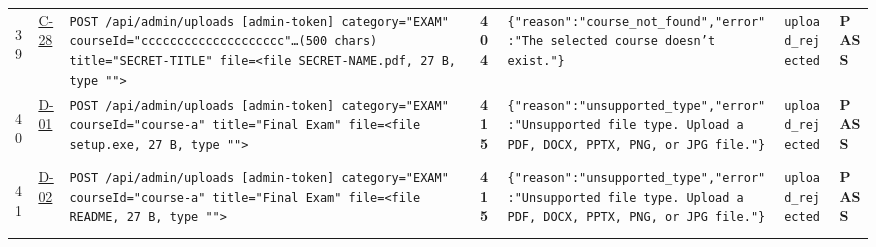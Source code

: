 \documentclass[10pt,a4paper]{article}
\begin{document}
\begin{landscape}
\begin{longtable}{@{}P{0.6cm}P{0.9cm}P{8.5cm}P{1.0cm}P{6.2cm}P{4.2cm}P{1.1cm}@{}}
\hypertarget{call39}{39} & \hyperlink{test-C-28}{C-28} & \texttt{POST /\allowbreak{}api/\allowbreak{}admin/\allowbreak{}uploads [admin-\allowbreak{}token] category=\allowbreak{}"\allowbreak{}EXAM"\allowbreak{} courseId=\allowbreak{}"\allowbreak{}cccccccccccccccccc\allowbreak{}cc"\allowbreak{}…(500 chars) title=\allowbreak{}"\allowbreak{}SECRET-\allowbreak{}TITLE"\allowbreak{} file=\allowbreak{}<file SECRET-\allowbreak{}NAME.\allowbreak{}pdf,\allowbreak{} 27 B,\allowbreak{} type "\allowbreak{}"\allowbreak{}>} & \textcolor{warnamber}{\textbf{404}} & \texttt{\{"\allowbreak{}reason"\allowbreak{}:\allowbreak{}"\allowbreak{}course\_\allowbreak{}not\_\allowbreak{}found"\allowbreak{},\allowbreak{}"\allowbreak{}error"\allowbreak{}:\allowbreak{}"\allowbreak{}The selected course doesn't exist.\allowbreak{}"\allowbreak{}\}} & \texttt{upload\_\allowbreak{}rejected} & \textcolor{passgreen}{\textbf{PASS}} \\
\hypertarget{call40}{40} & \hyperlink{test-D-01}{D-01} & \texttt{POST /\allowbreak{}api/\allowbreak{}admin/\allowbreak{}uploads [admin-\allowbreak{}token] category=\allowbreak{}"\allowbreak{}EXAM"\allowbreak{} courseId=\allowbreak{}"\allowbreak{}course-\allowbreak{}a"\allowbreak{} title=\allowbreak{}"\allowbreak{}Final Exam"\allowbreak{} file=\allowbreak{}<file setup.\allowbreak{}exe,\allowbreak{} 27 B,\allowbreak{} type "\allowbreak{}"\allowbreak{}>} & \textcolor{warnamber}{\textbf{415}} & \texttt{\{"\allowbreak{}reason"\allowbreak{}:\allowbreak{}"\allowbreak{}unsupported\_\allowbreak{}type"\allowbreak{},\allowbreak{}"\allowbreak{}error"\allowbreak{}:\allowbreak{}"\allowbreak{}Unsupported file type.\allowbreak{} Upload a PDF,\allowbreak{} DOCX,\allowbreak{} PPTX,\allowbreak{} PNG,\allowbreak{} or JPG file.\allowbreak{}"\allowbreak{}\}} & \texttt{upload\_\allowbreak{}rejected} & \textcolor{passgreen}{\textbf{PASS}} \\
\hypertarget{call41}{41} & \hyperlink{test-D-02}{D-02} & \texttt{POST /\allowbreak{}api/\allowbreak{}admin/\allowbreak{}uploads [admin-\allowbreak{}token] category=\allowbreak{}"\allowbreak{}EXAM"\allowbreak{} courseId=\allowbreak{}"\allowbreak{}course-\allowbreak{}a"\allowbreak{} title=\allowbreak{}"\allowbreak{}Final Exam"\allowbreak{} file=\allowbreak{}<file README,\allowbreak{} 27 B,\allowbreak{} type "\allowbreak{}"\allowbreak{}>} & \textcolor{warnamber}{\textbf{415}} & \texttt{\{"\allowbreak{}reason"\allowbreak{}:\allowbreak{}"\allowbreak{}unsupported\_\allowbreak{}type"\allowbreak{},\allowbreak{}"\allowbreak{}error"\allowbreak{}:\allowbreak{}"\allowbreak{}Unsupported file type.\allowbreak{} Upload a PDF,\allowbreak{} DOCX,\allowbreak{} PPTX,\allowbreak{} PNG,\allowbreak{} or JPG file.\allowbreak{}"\allowbreak{}\}} & \texttt{upload\_\allowbreak{}rejected} & \textcolor{passgreen}{\textbf{PASS}} \\

\end{longtable}
\end{landscape}
\end{document}
